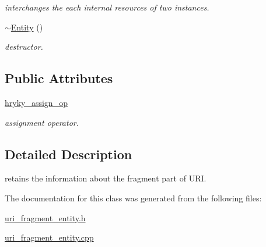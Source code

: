 \begin{DoxyCompactItemize}
\begin{DoxyCompactList}\small\item\em interchanges the each internal resources of two instances. \end{DoxyCompactList}\item 
\hypertarget{classhryky_1_1uri_1_1fragment_1_1_entity_a1baf620889504fc84336f1046400e9cd}{\hyperlink{classhryky_1_1uri_1_1fragment_1_1_entity_a1baf620889504fc84336f1046400e9cd}{$\sim$\-Entity} ()}\label{classhryky_1_1uri_1_1fragment_1_1_entity_a1baf620889504fc84336f1046400e9cd}

\begin{DoxyCompactList}\small\item\em destructor. \end{DoxyCompactList}\end{DoxyCompactItemize}
\subsection*{Public Attributes}
\begin{DoxyCompactItemize}
\item 
\hypertarget{classhryky_1_1uri_1_1fragment_1_1_entity_af7158c8821e4d48c9d7efbc175932c05}{\hyperlink{classhryky_1_1uri_1_1fragment_1_1_entity_af7158c8821e4d48c9d7efbc175932c05}{hryky\-\_\-assign\-\_\-op}}\label{classhryky_1_1uri_1_1fragment_1_1_entity_af7158c8821e4d48c9d7efbc175932c05}

\begin{DoxyCompactList}\small\item\em assignment operator. \end{DoxyCompactList}\end{DoxyCompactItemize}


\subsection{Detailed Description}
retains the information about the fragment part of U\-R\-I. 

The documentation for this class was generated from the following files\-:\begin{DoxyCompactItemize}
\item 
\hyperlink{uri__fragment__entity_8h}{uri\-\_\-fragment\-\_\-entity.\-h}\item 
\hyperlink{uri__fragment__entity_8cpp}{uri\-\_\-fragment\-\_\-entity.\-cpp}\end{DoxyCompactItemize}
